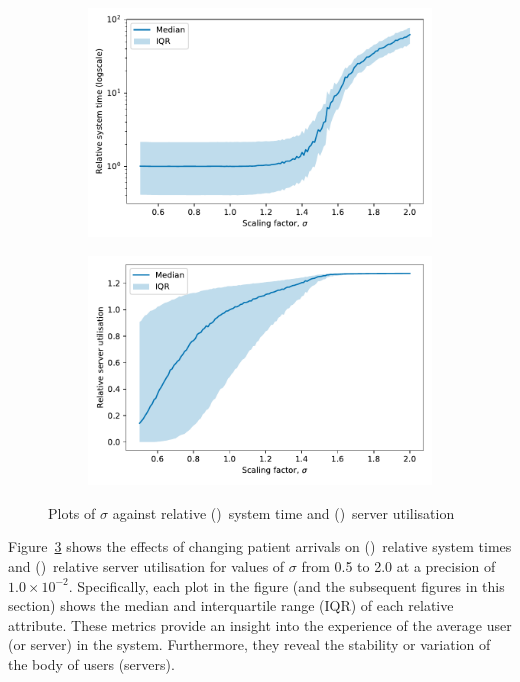 \begin{figure}
    \centering
    \begin{subfigure}{\imgwidth}
        \includegraphics[width=\linewidth]{lambda_time}
        \caption{}\label{fig:lambda_time}
    \end{subfigure}

    \begin{subfigure}{\imgwidth}
        \includegraphics[width=\linewidth]{lambda_util}
        \caption{}\label{fig:lambda_util}
    \end{subfigure}
    \caption{%
        Plots of \(\sigma\) against relative ()~system
        time and ()~server utilisation
    }\label{fig:lambda}
\end{figure}

Figure~\ref{fig:lambda} shows the effects of changing patient arrivals on
()~relative system times and
()~relative server utilisation for values of \(\sigma\)
from 0.5 to 2.0 at a precision of \(1.0 \times 10^{-2}\). Specifically, each
plot in the figure (and the subsequent figures in this section) shows the median
and interquartile range (IQR) of each relative attribute. These metrics provide
an insight into the experience of the average user (or server) in the system.
Furthermore, they reveal the stability or variation of the body of users
(servers).

